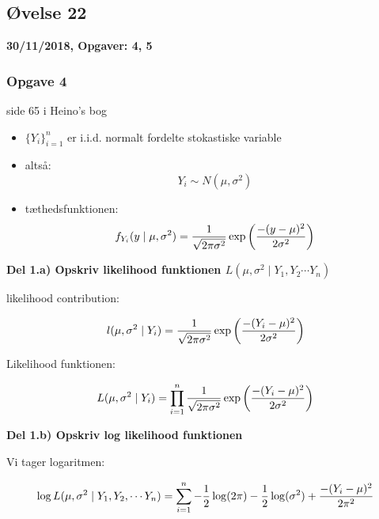 \horizline

\subsection{Øvelse 22}

\textbf{30/11/2018, Opgaver: 4, 5}

\subsubsection{Opgave 4}

side 65 i Heino's bog

\begin{itemize}
    \item $\{Y_i\}_{i=1}^{n}$ er i.i.d. normalt fordelte stokastiske variable
    \item altså:
    \begin{equation}
        Y_i \sim N(\mu, \sigma^2)
    \end{equation}
    \item tæthedsfunktionen:
    \begin{equation}
        f_{Y_{i}} (y \mid \mu, \sigma^2) = \frac{1}{\sqrt{2\pi \sigma^2}} \exp \left( \frac{-(y- \mu)^2}{2\sigma^2}\right)
    \end{equation}
\end{itemize}

\textbf{Del 1.a) Opskriv likelihood funktionen $L(\mu, \sigma^2 \mid Y_1, Y_2 \cdots Y_n)$}

likelihood contribution:

\begin{equation}
    l (\mu, \sigma^2 \mid Y_i) =  \frac{1}{\sqrt{2\pi \sigma^2}} \exp \left( \frac{-(Y_i - \mu)^2}{2\sigma^2}\right)
\end{equation}

Likelihood funktionen:

\begin{equation}
    L (\mu, \sigma^2 \mid Y_i) = \prod_{i=1}^{n} \frac{1}{\sqrt{2\pi \sigma^2}} \exp \left( \frac{-(Y_i - \mu)^2}{2\sigma^2}\right)
\end{equation}

\textbf{Del 1.b) Opskriv log likelihood funktionen}

Vi tager logaritmen:

\begin{equation}
    \log L (\mu, \sigma^2 \mid Y_1, Y_2, \cdots Y_n) = \sum_{i=1}^{n} - \frac{1}{2}\log(2\pi) - \frac{1}{2}\log(\sigma^2) + \frac{- (Y_i - \mu)^2}{2\pi^2}
\end{equation}

